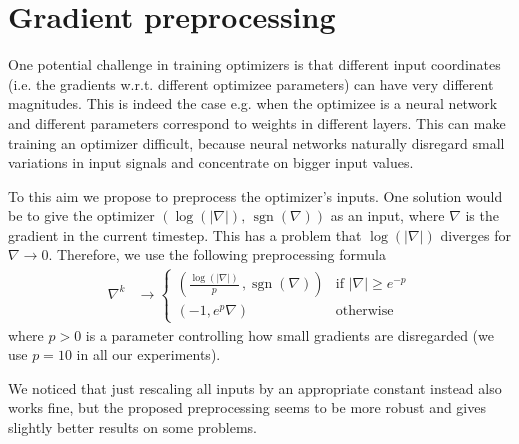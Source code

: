 \section{Gradient preprocessing}\label{sec:pre}

One potential challenge in training optimizers is that different input coordinates (i.e. the gradients w.r.t. different
optimizee parameters) can have very different magnitudes.
This is indeed the case e.g. when the optimizee is a neural network and different parameters
correspond to weights in different layers.
This can make training an optimizer difficult, because neural networks
naturally disregard small variations in input signals and concentrate on bigger input values.

To this aim we propose to preprocess the optimizer's inputs.
One solution would be to give the optimizer $\left(\log(|\nabla|),\,\operatorname{sgn}(\nabla)\right)$ as an input, where
$\nabla$ is the gradient in the current timestep.
This has a problem that $\log(|\nabla|)$ diverges for $\nabla \rightarrow 0$.
Therefore, we use the following preprocessing formula 
\begin{align*}
    \nabla^k &\rightarrow
\begin{cases}
    \left(\frac{\log(|\nabla|)}{p}\,, \operatorname{sgn}(\nabla)\right)& \text{if } |\nabla| \geq e^{-p}\\
    (-1, e^p \nabla)             & \text{otherwise}
\end{cases}
\end{align*}
where $p>0$ is a parameter controlling how small gradients are disregarded (we use $p=10$ in all our experiments).

We noticed that just rescaling all inputs by an appropriate constant instead also works fine, but
the proposed preprocessing seems to be more robust and gives slightly better results on some problems.








